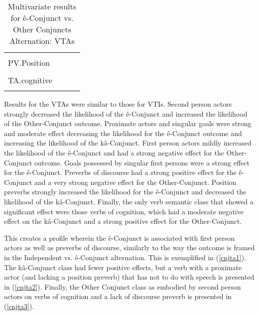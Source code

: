 \begin{table}[H]
\begin{tabular}{llll}
                     & \cellcolor[HTML]{B6D7A8}{($<$ 0.001)}       &        & \cellcolor[HTML]{EA9999}{(0.018)}  \\
PV.Position          & \cellcolor[HTML]{B6D7A8}{1.775}     & \cellcolor[HTML]{EA9999}{-1.459} &        \\
                     & \cellcolor[HTML]{B6D7A8}{(0.004)}   & \cellcolor[HTML]{EA9999}{(0.05)}   &        \\
TA.cognitive         &           & \cellcolor[HTML]{EA9999}{-0.428} & \cellcolor[HTML]{B6D7A8}{0.667}\\
                     &           & \cellcolor[HTML]{EA9999}{(0.048)}  & \cellcolor[HTML]{B6D7A8}{(0.016)}  \\
                \bottomrule
                \end{tabular}
                \caption{
                   Multivariate results for ê-Conjunct vs. Other Conjuncts Alternation: VTAs \\ \label{tab:taecnjall}
                  }
                \end{table}

        Results for the VTAs were similar to those for VTIs. Second person actors strongly decreased the likelihood of the ê-Conjunct and increased the likelihood of the Other-Conjunct outcome. Proximate actors and singular goals were strong and moderate effect decreasing the likelihood for the ê-Conjunct outcome and increasing the likelihood of the kâ-Conjunct. First person actors mildly increased the likelihood of the ê-Conjunct and had a strong negative effect for the Other-Conjunct outcome. Goals possessed by singular first persons were a strong effect for the ê-Conjunct. Preverbs of discourse had a strong positive effect for the ê-Conjunct and a very strong negative effect for the Other-Conjunct. Position preverbs strongly increased the likelihood for the ê-Conjunct and decreased the likelihood of the kâ-Conjunct. Finally, the only verb semantic class that showed a significant effect were those verbs of cognition, which had a moderate negative effect on the kâ-Conjunct and a strong positive effect for the Other-Conjunct. 
        
        
        This creates a profile wherein the ê-Conjunct is associated with first person actors as well as preverbs of discourse, similarly to the way the outcome is framed in the Independent vs. ê-Conjunct alternation. This is exemplified in (\ref{cnjta1}). The kâ-Conjunct class had fewer positive effects, but a verb with a proximate actor (and lacking a position preverb) that has not to do with speech is presented in (\ref{cnjta2}). Finally, the Other Conjunct class as embodied by second person actors on verbs of cognition and a lack of discourse preverb is presented in (\ref{cnjta3}).
        
